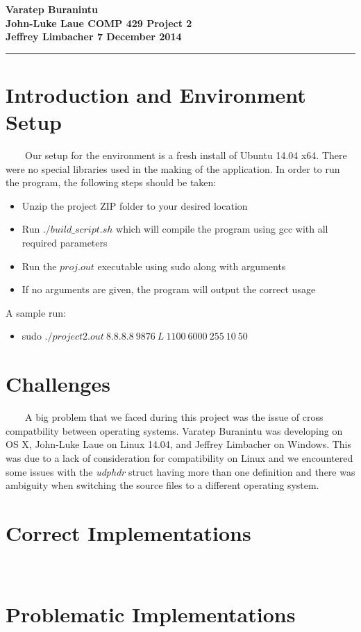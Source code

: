 \documentclass[11pt]{article}
\newcommand{\myname}{Project 2}
\newcommand{\course}{COMP 429}
\newcommand{\assignment}{Varatep Buranintu\\John-Luke Laue}
\newcommand{\probs}{Jeffrey Limbacher}
\newcommand{\duedate}{7 December 2014}
\newcommand{\mytitle}{
\begin{flushleft}
\bfseries
\assignment       \hspace*{\fill} \course \hspace*{\fill} \myname\\
\probs    \hspace*{\fill}                                 \duedate\\
\rule[10pt]{\linewidth}{1pt}
\end{flushleft}
}
\begin{document}
\thispagestyle{empty}   %
\mytitle                

\renewcommand{\qedsymbol}{}

\section{Introduction and Environment Setup}
\ \ \ \ Our setup for the environment is a fresh install of Ubuntu 14.04 x64. There were no special libraries used in the making of the application. In order to run the program, the following steps should be taken:\begin{itemize}
\item Unzip the project ZIP folder to your desired location
\item Run $./build\_script.sh$ which will compile the program using gcc with all required parameters
\item Run the $proj.out$ executable using sudo along with arguments
\item If no arguments are given, the program will output the correct usage
\end{itemize}
A sample run:
\begin{itemize}
\item sudo $./project2.out\ 8.8.8.8\ 9876\ L\ 1100\ 6000\ 255\ 10\ 50$
\end{itemize}

\section{Challenges}
\ \ \ \ A big problem that we faced during this project was the issue of cross compatbility between operating systems. Varatep Buranintu was developing on OS X, John-Luke Laue on Linux 14.04, and Jeffrey Limbacher on Windows. This was due to a lack of consideration for compatibility on Linux and we encountered some issues with the \textit{udphdr} struct having more than one definition and there was ambiguity when switching the source files to a different operating system. 

\section{Correct Implementations}
\ \ \ \ 

\section{Problematic Implementations}
\ \ \ \ 
\end{document}

